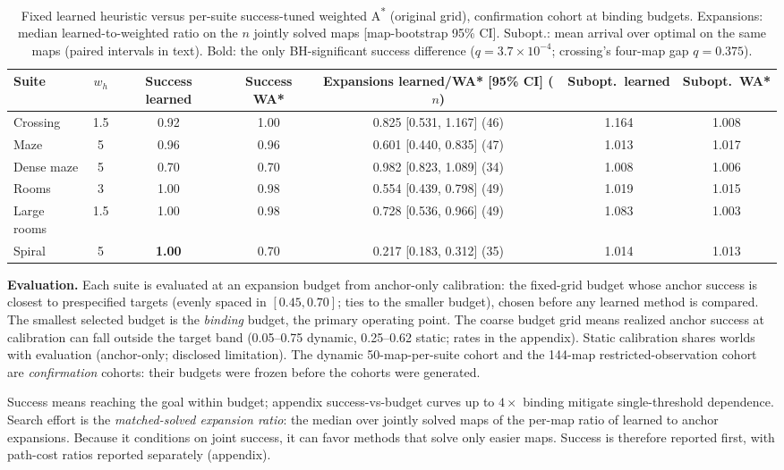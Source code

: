 \documentclass[letterpaper]{article} %
\begin{document}
\begin{table}[t]
\centering
\small
\begin{tabular}{lcccccc}
\toprule
Suite & $w_h$ & Success learned & Success WA* & Expansions learned/WA* [95\% CI] ($n$) & Subopt.\ learned & Subopt.\ WA* \\
\midrule
Crossing & 1.5 & 0.92 & 1.00 & 0.825 [0.531, 1.167] (46) & 1.164 & 1.008 \\
Maze & 5 & 0.96 & 0.96 & 0.601 [0.440, 0.835] (47) & 1.013 & 1.017 \\
Dense maze & 5 & 0.70 & 0.70 & 0.982 [0.823, 1.089] (34) & 1.008 & 1.006 \\
Rooms & 3 & 1.00 & 0.98 & 0.554 [0.439, 0.798] (49) & 1.019 & 1.015 \\
Large rooms & 1.5 & 1.00 & 0.98 & 0.728 [0.536, 0.966] (49) & 1.083 & 1.003 \\
Spiral & 5 & \textbf{1.00} & 0.70 & 0.217 [0.183, 0.312] (35) & 1.014 & 1.013 \\
\bottomrule
\end{tabular}
\caption{Fixed learned heuristic versus per-suite success-tuned weighted A\textsuperscript{*} (original grid), confirmation cohort at binding budgets. Expansions: median learned-to-weighted ratio on the $n$ jointly solved maps [map-bootstrap 95\% CI]. Subopt.: mean arrival over optimal on the same maps (paired intervals in text). Bold: the only BH-significant success difference ($q{=}3.7\times10^{-4}$; crossing's four-map gap $q{=}0.375$).}
\label{tab:wastar-main}
\end{table}

\textbf{Evaluation.} Each suite is evaluated at an expansion budget from anchor-only calibration: the fixed-grid budget whose anchor success is closest to prespecified targets (evenly spaced in $[0.45,0.70]$; ties to the smaller budget), chosen before any learned method is compared. The smallest selected budget is the \emph{binding} budget, the primary operating point. The coarse budget grid means realized anchor success at calibration can fall outside the target band (0.05--0.75 dynamic, 0.25--0.62 static; rates in the appendix). Static calibration shares worlds with evaluation (anchor-only; disclosed limitation). The dynamic 50-map-per-suite cohort and the 144-map restricted-observation cohort are \emph{confirmation} cohorts: their budgets were frozen before the cohorts were generated.

Success means reaching the goal within budget; appendix success-vs-budget curves up to $4\times$ binding mitigate single-threshold dependence. Search effort is the \emph{matched-solved expansion ratio}: the median over jointly solved maps of the per-map ratio of learned to anchor expansions. Because it conditions on joint success, it can favor methods that solve only easier maps. Success is therefore reported first, with path-cost ratios reported separately (appendix).
\end{document}
